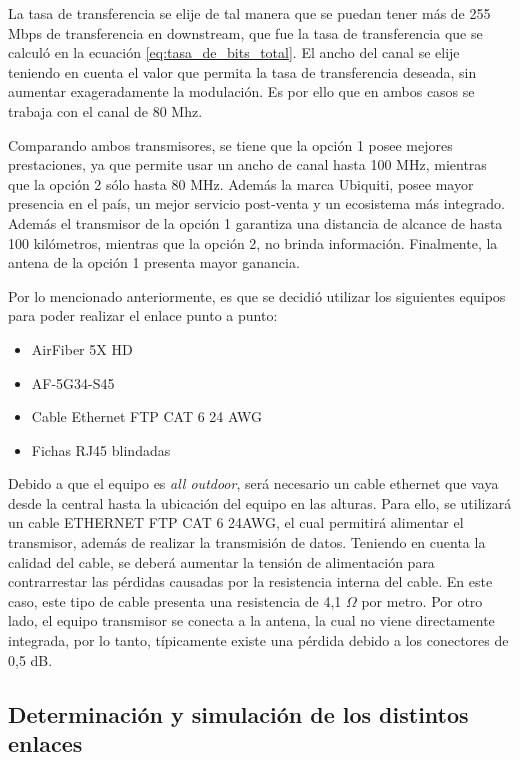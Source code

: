 \documentclass[11pt,a4paper]{article}
\begin{document}
La tasa de transferencia se elije de tal manera que se puedan tener más de 255 Mbps de transferencia en downstream, que fue la tasa de transferencia que se calculó en la ecuación \ref{eq:tasa_de_bits_total}. 
El ancho del canal se elije teniendo en cuenta el valor que permita la tasa de transferencia deseada, sin aumentar exageradamente la modulación. 
Es por ello que en ambos casos se trabaja con el canal de 80 Mhz.  

Comparando ambos transmisores, se tiene que la opción 1 posee mejores prestaciones, ya que permite usar un ancho de canal hasta 100 MHz, mientras que la opción 2 sólo hasta 80 MHz. Además la marca Ubiquiti, posee mayor presencia en el país, un mejor servicio post-venta y un ecosistema más integrado.
Además el transmisor de la opción 1 garantiza una distancia de alcance de hasta 100 kilómetros, mientras que la opción 2, no brinda información. 
Finalmente, la antena de la opción 1 presenta mayor ganancia. 

Por lo mencionado anteriormente, es que se decidió utilizar los siguientes equipos para poder realizar el enlace punto a punto:

\begin{itemize}
    \item  AirFiber 5X HD
    \item  AF-5G34-S45
    \item  Cable Ethernet FTP CAT 6 24 AWG
    \item  Fichas RJ45 blindadas
\end{itemize}

Debido a que el equipo es \textit{all outdoor}, será necesario un cable ethernet que vaya desde la central hasta la ubicación del equipo en las alturas. 
Para ello, se utilizará un cable ETHERNET FTP CAT 6 24AWG, el cual permitirá alimentar el transmisor, además de realizar la transmisión de datos.
Teniendo en cuenta la calidad del cable, se deberá aumentar la tensión de alimentación para contrarrestar las pérdidas causadas por la resistencia interna del cable. 
En este caso, este tipo de cable presenta una resistencia de 4,1 $\Omega$ por metro. 
Por otro lado, el equipo transmisor se conecta a la antena, la cual no viene directamente integrada, por lo tanto, típicamente existe una pérdida debido a los conectores de 0,5 dB. 

\subsection{Determinación y simulación de los distintos enlaces}
\end{document}

